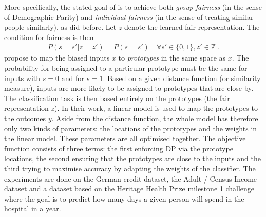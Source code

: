 More specifically, the stated goal of \citet{zemel2013learning} is
to achieve both \emph{group fairness} (in the sense of Demographic Parity)
and \emph{individual fairness} (in the sense of treating similar people similarly),
as \citet{dwork2012fairness} did before.
Let \(z\) denote the learned fair representation.
The condition for fairness is then
\begin{align}
  \label{eq:fair-representation}
  P(s=s'|z=z') = P(s=s') \quad \forall s' \in \{0, 1\}, z' \in \mathbb{Z}~.
\end{align}
\citet{zemel2013learning} propose to map the biased inputs \(x\) to \emph{prototypes} in the same space as \(x\).
The probability for being assigned to a particular prototype
must be the same for inputs with \(s=0\) and for \(s=1\).
Based on a given distance function (or similarity measure),
inputs are more likely to be assigned to prototypes that are close-by.
The classification task is then based entirely on the prototypes (the fair representation \(z\)).
In their work, a linear model is used to map the prototypes to the outcomes \(y\).
Aside from the distance function, the whole model has therefore only two kinds of parameters:
the locations of the prototypes and the weights in the linear model.
These parameters are all optimised together.
The objective function consists of three terms:
the first enforcing \acf{DP} via the prototype locations,
the second ensuring that the prototypes are close to the inputs
and the third trying to maximise accuracy by adapting the weights of the classifier.
%
The experiments are done on the German credit dataset, the Adult / Census Income dataset
and a dataset based on the Heritage Health Prize milestone 1 challenge~\citep{heritagehealth}
where the goal is to predict how many days a given person will spend in the hospital in a year.


